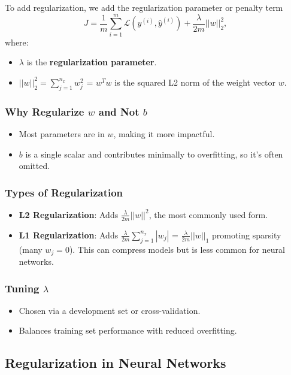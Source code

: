 \documentclass[letterpaper,12pt,notitlepage,twoside]{report}
\begin{document}
To add regularization, we add the regularization parameter or penalty term
    \[
    J = \frac{1}{m} \sum_{i=1}^m \mathcal{L} (y^{(i)}, \hat{y}^{(i)}) + \frac{\lambda}{2m} ||w||_2^2,
    \]
    where:
    \begin{itemize}
        \item \( \lambda \) is the \textbf{regularization parameter}.
        \item \( ||w||_2^2 = \sum_{j=1}^{n_x} w_j^2 \) = \( w^Tw \) is the squared L2 norm of the weight vector \( w \).
    \end{itemize}

\subsubsection{Why Regularize \( w \) and Not \( b \)}
\begin{itemize}
    \item Most parameters are in \( w \), making it more impactful.
    \item \( b \) is a single scalar and contributes minimally to overfitting, so it's often omitted.
\end{itemize}

\subsubsection{Types of Regularization}
\begin{itemize}
    \item \textbf{L2 Regularization}: Adds \( \frac{\lambda}{2m} ||w||^2 \), the most commonly used form.
    \item \textbf{L1 Regularization}: Adds \( \frac{\lambda}{2m} \sum_{j=1}^{n_x} |w_j| \) = \( \frac{\lambda}{2m} ||w||_1 \)  promoting sparsity (many \( w_j = 0 \)). This can compress models but is less common for neural networks.
\end{itemize}

\subsubsection{Tuning \( \lambda \)} 
\begin{itemize}
    \item Chosen via a development set or cross-validation.
    \item Balances training set performance with reduced overfitting.
\end{itemize}

\subsection{Regularization in Neural Networks}
\end{document}
